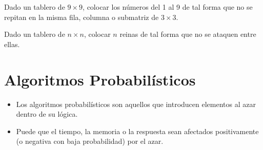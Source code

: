 \documentclass{templateNote}
\begin{document}
\begin{tcolorbox}[colback=blue!4!white,colframe=blue!75!black,title=Sudoku]
    Dado un tablero de $9 \times 9$, colocar los números del 1 al 9 de tal forma que no se repitan en la misma fila, columna o submatriz de $3 \times 3$.
\end{tcolorbox}

\begin{tcolorbox}[colback=blue!4!white,colframe=blue!75!black,title=Problema de las $n$ reinas]
    Dado un tablero de $n \times n$, colocar $n$ reinas de tal forma que no se ataquen entre ellas.
\end{tcolorbox}

\newpage

\section{Algoritmos Probabilísticos}
\begin{itemize}
    \item Los algoritmos probabilísticos son aquellos que introducen elementos al azar dentro de su lógica.
    \item Puede que el tiempo, la memoria o la respuesta sean afectados positivamente (o negativa con baja probabilidad) por el azar.
\end{itemize}
\end{document}
